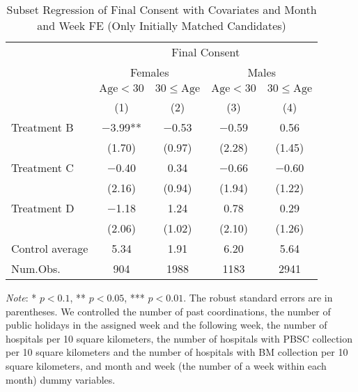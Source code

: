 \documentclass[12pt, a4paper]{article}
\begin{document}
\begin{table}[H]

\caption{\label{tab:lm-consent-subset2-init}Subset Regression of Final Consent with Covariates and Month and Week FE (Only Initially Matched Candidates)}
\centering
\fontsize{8}{10}\selectfont
\begin{threeparttable}
\begin{tabular}[t]{lcccc}
\toprule
\multicolumn{1}{c}{ } & \multicolumn{4}{c}{Final Consent} \\
\cmidrule(l{3pt}r{3pt}){2-5}
\multicolumn{1}{c}{ } & \multicolumn{2}{c}{Females} & \multicolumn{2}{c}{Males} \\
\cmidrule(l{3pt}r{3pt}){2-3} \cmidrule(l{3pt}r{3pt}){4-5}
\multicolumn{1}{c}{ } & \multicolumn{1}{c}{$\text{Age} < 30$} & \multicolumn{1}{c}{$30 \le \text{Age}$} & \multicolumn{1}{c}{$\text{Age} < 30$} & \multicolumn{1}{c}{$30 \le \text{Age}$} \\
\cmidrule(l{3pt}r{3pt}){2-2} \cmidrule(l{3pt}r{3pt}){3-3} \cmidrule(l{3pt}r{3pt}){4-4} \cmidrule(l{3pt}r{3pt}){5-5}
  & (1) & (2) & (3) & (4)\\
\midrule
Treatment B & \num{-3.99}** & \num{-0.53} & \num{-0.59} & \num{0.56}\\
 & (\num{1.70}) & (\num{0.97}) & (\num{2.28}) & (\num{1.45})\\
Treatment C & \num{-0.40} & \num{0.34} & \num{-0.66} & \num{-0.60}\\
 & (\num{2.16}) & (\num{0.94}) & (\num{1.94}) & (\num{1.22})\\
Treatment D & \num{-1.18} & \num{1.24} & \num{0.78} & \num{0.29}\\
 & (\num{2.06}) & (\num{1.02}) & (\num{2.10}) & (\num{1.26})\\
\midrule
Control average & 5.34 & 1.91 & 6.20 & 5.64\\
Num.Obs. & \num{904} & \num{1988} & \num{1183} & \num{2941}\\
\bottomrule
\end{tabular}
\begin{tablenotes}
\item \emph{Note}: * $p < 0.1$, ** $p < 0.05$, *** $p < 0.01$. The robust standard errors are in parentheses. We controlled the number of past coordinations, the number of public holidays in the assigned week and the following week, the number of hospitals per 10 square kilometers, the number of hospitals with PBSC collection per 10 square kilometers and the number of hospitals with BM collection per 10 square kilometers, and month and week (the number of a week within each month) dummy variables.
\end{tablenotes}
\end{threeparttable}
\end{table}

\clearpage


\end{document}
